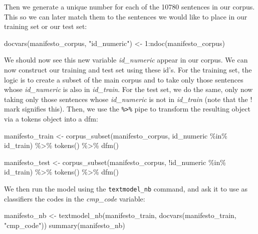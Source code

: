\documentclass[
]{article}
\newenvironment{Shaded}{\begin{snugshade}}{\end{snugshade}}
\newcommand{\DecValTok}[1]{\textcolor[rgb]{0.00,0.00,0.81}{#1}}
\newcommand{\FunctionTok}[1]{\textcolor[rgb]{0.00,0.00,0.00}{#1}}
\newcommand{\NormalTok}[1]{#1}
\newcommand{\OtherTok}[1]{\textcolor[rgb]{0.56,0.35,0.01}{#1}}
\newcommand{\SpecialCharTok}[1]{\textcolor[rgb]{0.00,0.00,0.00}{#1}}
\newcommand{\StringTok}[1]{\textcolor[rgb]{0.31,0.60,0.02}{#1}}
\begin{document}
Then we generate a unique number for each of the 10780 sentences in our corpus. This so we can later match them to the sentences we would like to place in our training set or our test set:

\begin{Shaded}
\begin{Highlighting}[]
\FunctionTok{docvars}\NormalTok{(manifesto\_corpus, }\StringTok{"id\_numeric"}\NormalTok{) }\OtherTok{\textless{}{-}} \DecValTok{1}\SpecialCharTok{:}\FunctionTok{ndoc}\NormalTok{(manifesto\_corpus)}
\end{Highlighting}
\end{Shaded}

We should now see this new variable \emph{id\_numeric} appear in our corpus. We can now construct our training and test set using these id's. For the training set, the logic is to create a subset of the main corpus and to take only those sentences whose \emph{id\_numeric} is also in \emph{id\_train}. For the test set, we do the same, only now taking only those sentences whose \emph{id\_numeric} is not in \emph{id\_train} (note that the ! mark signifies this). Then, we use the \texttt{\%\textgreater{}\%} pipe to transform the resulting object via a tokens object into a dfm:

\begin{Shaded}
\begin{Highlighting}[]
\NormalTok{manifesto\_train }\OtherTok{\textless{}{-}} \FunctionTok{corpus\_subset}\NormalTok{(manifesto\_corpus, id\_numeric }\SpecialCharTok{\%in\%}\NormalTok{ id\_train) }\SpecialCharTok{\%\textgreater{}\%}
 \FunctionTok{tokens}\NormalTok{() }\SpecialCharTok{\%\textgreater{}\%}
 \FunctionTok{dfm}\NormalTok{()}

\NormalTok{manifesto\_test }\OtherTok{\textless{}{-}} \FunctionTok{corpus\_subset}\NormalTok{(manifesto\_corpus, }\SpecialCharTok{!}\NormalTok{id\_numeric }\SpecialCharTok{\%in\%}\NormalTok{ id\_train) }\SpecialCharTok{\%\textgreater{}\%}
 \FunctionTok{tokens}\NormalTok{() }\SpecialCharTok{\%\textgreater{}\%}
 \FunctionTok{dfm}\NormalTok{()}
\end{Highlighting}
\end{Shaded}

We then run the model using the \texttt{textmodel\_nb} command, and ask it to use as classifiers the codes in the \emph{cmp\_code} variable:

\begin{Shaded}
\begin{Highlighting}[]
\NormalTok{manifesto\_nb }\OtherTok{\textless{}{-}} \FunctionTok{textmodel\_nb}\NormalTok{(manifesto\_train, }\FunctionTok{docvars}\NormalTok{(manifesto\_train, }\StringTok{"cmp\_code"}\NormalTok{))}
\FunctionTok{summary}\NormalTok{(manifesto\_nb)}
\end{Highlighting}
\end{Shaded}
\end{document}
